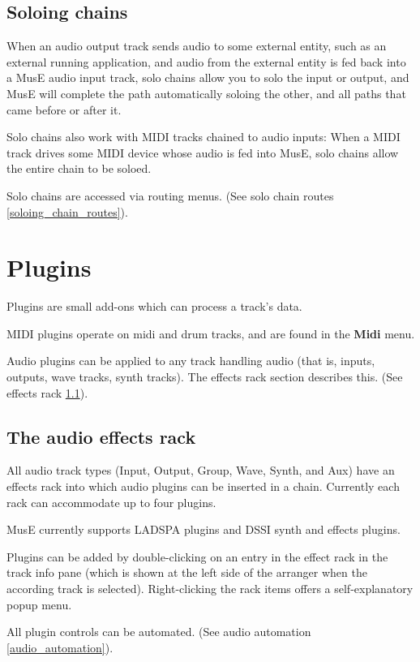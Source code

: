 \documentclass[a4paper]{report}
\newcommand{\menu}[1]{\textbf{#1}}
\begin{document}
\subsection{Soloing chains} \label{soloing_chains}
When an audio output track sends audio to some external entity, such
as an external running application, and audio from the external entity
is fed back into a MusE audio input track, solo chains allow you to
solo the input or output, and MusE will complete the path automatically
soloing the other, and all paths that came before or after it.

Solo chains also work with MIDI tracks chained to audio inputs:
When a MIDI track drives some MIDI device whose audio is fed into MusE,
solo chains allow the entire chain to be soloed.

Solo chains are accessed via routing menus. (See solo chain routes
\ref{soloing_chain_routes}).

\section{Plugins} \label{plugins}
Plugins are small add-ons which can process a track's data.

MIDI plugins operate on midi and drum tracks, and are found in
the \menu{Midi} menu.

Audio plugins can be applied to any track handling audio (that is,
inputs, outputs, wave tracks, synth tracks). The effects rack
section describes this. (See effects rack \ref{effects_rack}).

\subsection{The audio effects rack} \label{effects_rack}
All audio track types (Input, Output, Group, Wave, Synth, and Aux) have
an effects rack into which audio plugins can be inserted in a chain.
Currently each rack can accommodate up to four plugins.

MusE currently supports LADSPA plugins and DSSI synth and effects
plugins.

Plugins can be added by double-clicking on an entry in the effect rack
in the track info pane (which is shown at the left side of the arranger
when the according track is selected). Right-clicking the rack items
offers a self-explanatory popup menu.

All plugin controls can be automated. (See audio automation
\ref{audio_automation}).
\end{document}
